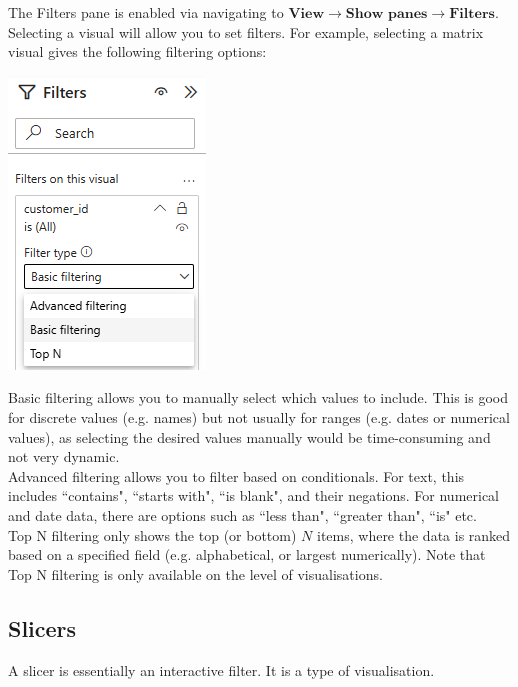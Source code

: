 \documentclass[10pt, openany, twocolumn]{book}
\begin{document}
The Filters pane is enabled via navigating to
$\textbf{View} \rightarrow \textbf{Show panes} \rightarrow \textbf{Filters}$.\\

Selecting a visual will allow you to set filters. For example, selecting a matrix visual gives the following filtering options:
\begin{center}
        \includegraphics[width=0.40\columnwidth]{images/filter_visual.png}
\end{center}
Basic filtering allows you to manually select which values to include. This is good for discrete values (e.g. names) but not usually for ranges (e.g. dates or numerical values), as selecting the desired values manually would be time-consuming and not very dynamic.\\

Advanced filtering allows you to filter based on conditionals. For text, this includes ``contains", ``starts with", ``is blank", and their negations. For numerical and date data, there are options such as ``less than", ``greater than", ``is" etc. \\

Top N filtering only shows the top (or bottom) $N$ items, where the data is ranked based on a specified field (e.g. alphabetical, or largest numerically). Note that Top N filtering is only available on the level of visualisations.

\subsection*{Slicers}

A slicer is essentially an interactive filter. It is a type of visualisation. \\
\end{document}
